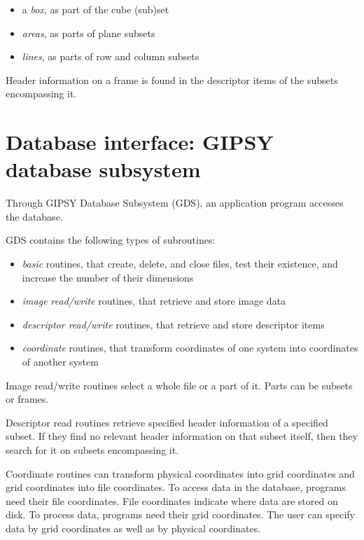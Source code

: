 \begin{itemize}

\item a {\em box}, as part of the cube (sub)set

\item {\em areas}, as parts of plane subsets

\item {\em lines}, as parts of row and column subsets

\end{itemize}


Header information on a frame is found in the descriptor items of the
subsets encompassing it. 

\section{Database interface: GIPSY database subsystem}
\label{sec:SysGDS}

Through GIPSY Database Subsystem (GDS), an application program accesses
the database. 

GDS contains
the following types of subroutines:

\begin{itemize}

\item {\em basic} routines, that create, delete, and close files, test
their existence, and increase the number of their dimensions

\item {\em image read/write} routines, that retrieve and store image
data

\item {\em descriptor read/write} routines, that retrieve and store
descriptor items

\item {\em coordinate} routines, that transform coordinates of one
system into coordinates of another system

\end{itemize}

Image read/write routines select a whole file or a part of it.  Parts
can be subsets or frames. 

Descriptor read routines retrieve specified header information of a
specified subset.  If they find no relevant header information on that
subset itself, then they search for it on subsets encompassing it. 

Coordinate routines can transform physical coordinates into grid
coordinates and grid coordinates into file coordinates.  To access data
in the database, programs need their file coordinates.  File coordinates
indicate where data are stored on disk.  To process data, programs need
their grid coordinates.  The user can specify data by grid coordinates
as well as by physical coordinates. 

